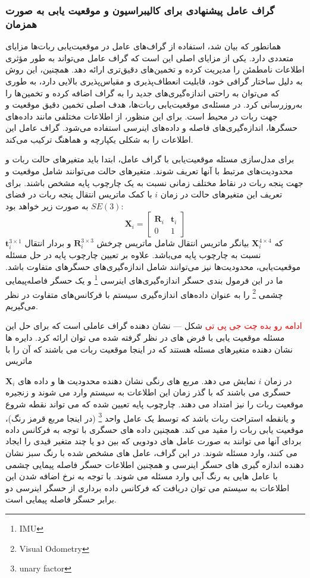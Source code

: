 \subsubsection{گراف عامل پیشنهادی برای کالیبراسیون و موقعیت یابی به صورت همزمان}
  
همانطور که بیان شد، استفاده از گراف‌های عامل در موقعیت‌یابی ربات‌ها مزایای متعددی دارد. یکی از مزایای اصلی این است که گراف عامل می‌تواند به طور مؤثری اطلاعات نامطمئن را مدیریت کرده و تخمین‌های دقیق‌تری ارائه دهد. همچنین، این روش به دلیل ساختار گرافی خود، قابلیت انعطاف‌پذیری و مقیاس‌پذیری بالایی دارد، به طوری که می‌توان به راحتی اندازه‌گیری‌های جدید را به گراف اضافه کرده و تخمین‌ها را به‌روزرسانی کرد. در مسئله‌ی موقعیت‌یابی ربات‌ها، هدف اصلی تخمین دقیق موقعیت و جهت ربات در محیط است. برای این منظور، از اطلاعات مختلفی مانند داده‌های حسگرها، اندازه‌گیری‌های فاصله و داده‌های اینرسی استفاده می‌شود. گراف عامل این اطلاعات را به شکلی یکپارچه و هماهنگ ترکیب می‌کند.

برای مدل‌سازی مسئله موقعیت‌یابی با گراف عامل، ابتدا باید متغیرهای حالت ربات و محدودیت‌های مرتبط با آنها تعریف شوند. متغیرهای حالت می‌توانند شامل موقعیت و جهت پنجه ربات در نقاط مختلف زمانی نسبت به یک چارچوب پایه مشخص باشند. برای تعریف این متغیرهای حالت در زمان $i$ با کمک ماتریس انتقال پنجه ربات در فضای
$SE(3)$
به صورت زیر خواهد بود:
\begin{equation} \label{eq:transformation matrix}
	\boldsymbol{X}_i = \begin{bmatrix}
							\mathbf{R}_i & \mathbf{t}_i \\
								0 & 1
				     	\end{bmatrix}
\end{equation}
که 
$\boldsymbol{X}_i^{4\times4}$
 بیانگر ماتریس انتقال شامل ماتریس چرخش 
$\mathbf{R}_i^{3\times3}$
 و بردار انتقال 
 $ \mathbf{t}_i^{3\times1}$ 
 نسبت به چارچوب پایه می‌باشد. علاوه بر تعیین چارچوب پایه در حل مسئله موقعیت‌یابی، محدودیت‌ها نیز می‌توانند
شامل اندازه‌گیری‌های حسگرهای متفاوت باشد. 
 ما در این فرمول بندی
 حسگر اندازه‌گیری‌های اینرسی
\footnote{IMU} 
 و یک حسگر فاصله‌پیمایی چشمی
\footnote{Visual Odometry}
را به عنوان داده‌های اندازه‌گیری سیستم با فرکانس‌های متفاوت در نظر می‌گیریم. 

\textcolor{red}{ادامه رو بده چت جی پی تی}
شکل --- نشان دهنده گراف عاملی است که برای حل این مسئله موقعیت یابی با فرض های در نظر گرفته شده می توان ارائه کرد. دایره ها نشان دهنده متغیرهای مسئله هستند که در اینجا موقعیت ربات می باشند که آن را با ماتریس 

$\boldsymbol{X}_i$ 
در زمان $i$ نمایش می دهد. مربع های رنگی نشان دهنده محدودیت ها و داده های حسگری می باشند که با گذر زمان این اطلاعات به سیستم وارد می شوند و زنجیره موقعیت ربات را نیز امتداد می دهند. چارچوب پایه تعیین شده که می تواند نقطه شروع و یانقطه استراحت ربات باشد که توسط یک عامل واحد
\footnote{unary factor}
(در اینجا مربع قرمز رنگ)، موقعیت یابی ربات را مقید می کند. همچنین داده های حسگری با توجه به فرکانس داده بردای آنها می توانند به صورت عامل های دودویی که بین دو یا چند متغیر قیدی را ایجاد می کنند، وارد مسئله شوند. در این گراف، عامل های مشخص شده با رنگ سبز نشان دهنده اندازه گیری های حسگر اینرسی و همچنین اطلاعات حسگر فاصله پیمایی چشمی با عامل هایی به رنگ آبی وارد مسئله می شوند. با توجه به نرخ اضافه شدن این اطلاعات به سیستم می توان دریافت که فرکانس داده برداری از حسگر اینرسی دو برابر حسگر فاصله پیمایی است. 

